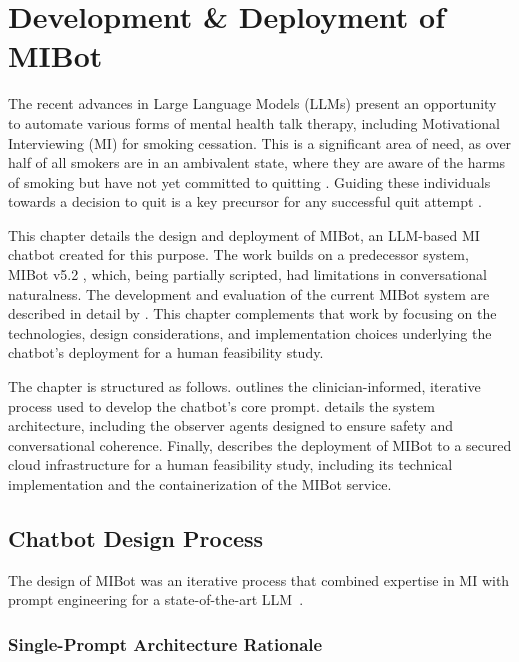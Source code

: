 \chapter{Development \& Deployment of MIBot}
\label{ch:mibot}

The recent advances in Large Language Models (LLMs) present an opportunity to automate
various forms of mental health talk therapy, including Motivational Interviewing (MI)
for smoking cessation. This is a significant area of need, as over half of all smokers
are in an ambivalent state, where they are aware of the harms of smoking but have not
yet committed to quitting \citep{Babb2017}. Guiding these individuals towards a
decision to quit is a key precursor for any successful quit attempt \citep{West2006}.

This chapter details the design and deployment of MIBot, an LLM-based MI chatbot
created for this purpose. The work builds on a predecessor system, MIBot v5.2
\citep{brown2023mi}, which, being partially scripted, had limitations in conversational
naturalness. The development and evaluation of the current MIBot system are described
in detail by \citet{mahmood-etal-2025-fully}. This chapter complements that work by
focusing on the technologies, design considerations, and implementation choices
underlying the chatbot's deployment for a human feasibility study.

The chapter is structured as follows.  outlines the
clinician-informed, iterative process used to develop the chatbot's core prompt.
 details the system architecture, including the observer agents
designed to ensure safety and conversational coherence. Finally, 
describes the deployment of MIBot to a secured cloud infrastructure for a human
feasibility study, including its technical implementation and the containerization of
the MIBot service.

\section{Chatbot Design Process}
\label{sec:iterative-development}

The design of MIBot was an iterative process that combined expertise in MI with prompt
engineering for a state-of-the-art LLM~\citep{openai2024gpt4ocard}.

\subsection{Single-Prompt Architecture Rationale}
\label{sec:single-prompt-rationale}

